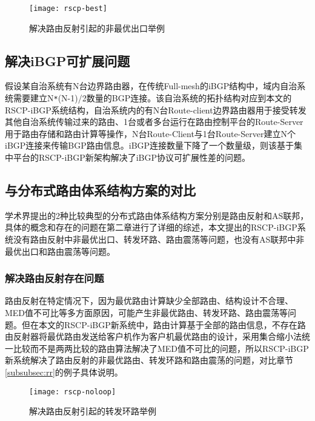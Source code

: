 \begin{figure}
  \centering
  \texttt{[image: rscp-best]}
  \caption{解决路由反射引起的非最优出口举例}
  \label{fig:rscp-best}
\end{figure}


\subsection{解决iBGP可扩展问题}

假设某自治系统有N台边界路由器，在传统Full-mesh的iBGP结构中，域内自治系统需要建立N\verb+*+(N-1)/2数量的BGP连接。该自治系统的拓扑结构对应到本文的RSCP-iBGP系统结构，自治系统内的有N台Route-client边界路由器用于接受转发其他自治系统传输过来的路由、1台或者多台运行在路由控制平台的Route-Server用于路由存储和路由计算等操作，N台Route-Client与1台Route-Server建立N个iBGP连接来传输BGP路由信息。iBGP连接数量下降了一个数量级，则该基于集中平台的RSCP-iBGP新架构解决了iBGP协议可扩展性差的问题。

\subsection{与分布式路由体系结构方案的对比}

学术界提出的2种比较典型的分布式路由体系结构方案分别是路由反射和AS联邦，具体的概念和存在的问题在第二章进行了详细的综述，本文提出的RSCP-iBGP系统没有路由反射中非最优出口、转发环路、路由震荡等问题，也没有AS联邦中非最优出口和路由震荡等问题。

\subsubsection{解决路由反射存在问题}



路由反射在特定情况下，因为最优路由计算缺少全部路由、结构设计不合理、MED值不可比等多方面原因，可能产生非最优路由、转发环路、路由震荡等问题。但在本文的RSCP-iBGP新系统中，路由计算基于全部的路由信息，不存在路由反射器将最优路由发送给客户机作为客户机最优路由的设计，采用集合缩小法统一比较而不是两两比较的路由算法解决了MED值不可比的问题，所以RSCP-iBGP新系统解决了路由反射的非最优路由、转发环路和路由震荡的问题，对比章节\ref{subsubsec:rr}的例子具体说明。\\

\begin{figure}
  \centering
  \texttt{[image: rscp-noloop]}
  \caption{解决路由反射引起的转发环路举例}
  \label{fig:rscp-noloop}
\end{figure}


